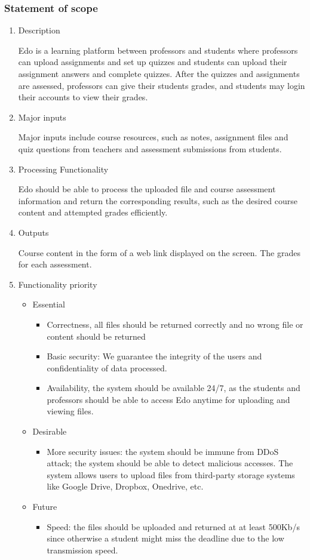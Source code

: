 \documentclass[paper=a4, fontsize=11pt]{scrartcl}
\numberwithin{equation}{section}		%
\numberwithin{figure}{section}			%
\numberwithin{table}{section}				%
\begin{document}
\subsubsection{Statement of scope}
\begin{enumerate}
	\item Description
	\par Edo is a learning platform between professors and students where professors can upload assignments and set up quizzes and students can upload their assignment answers and complete quizzes. After the quizzes and assignments are assessed, professors can give their students grades, and students may login their accounts to view their grades.
	\item Major inputs
	\par Major inputs include course resources, such as notes, assignment files and quiz questions from teachers and assessment submissions from students.
	\item Processing Functionality
	\par Edo should be able to process the uploaded file and course assessment information and return the corresponding results, such as the desired course content and attempted grades efficiently.
	\item Outputs
	\par Course content in the form of a web link displayed on the screen. The grades for each assessment. 
	\item Functionality priority
	\begin{itemize}
		\item Essential
		\begin{itemize}
			\item Correctness, all files should be returned correctly and no wrong file or content should be returned
			\item Basic security: We guarantee the integrity of the users and confidentiality of data processed.
			\item Availability, the system should be available 24/7, as the students and professors should be able to access Edo anytime for uploading and viewing files.
		\end{itemize}
		\item Desirable
		\begin{itemize}
			\item More security issues: the system should be immune from DDoS attack; the system should be able to detect malicious accesses.
			The system allows users to upload files from third-party storage systems like Google Drive, Dropbox, Onedrive, etc.
		\end{itemize}
		\item Future
		\begin{itemize}
			\item Speed: the files should be uploaded and returned at at least 500Kb/s since otherwise a student might miss the deadline due to the low transmission speed.
		\end{itemize}
	\end{itemize}	
\end{enumerate}
\end{document}
